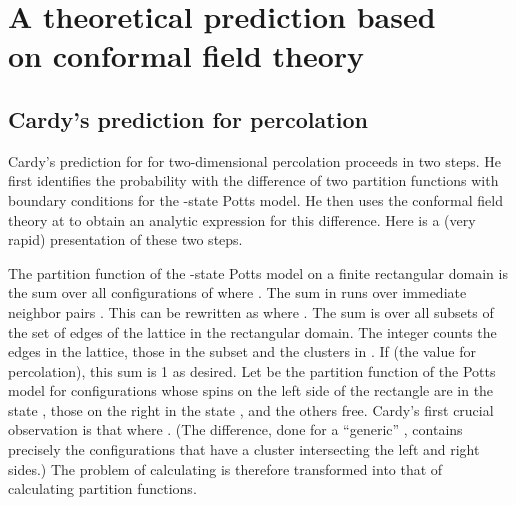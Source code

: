 \documentclass[a4paper,12pt]{article}
\begin{document}
 
\section{A theoretical prediction based\\ on conformal field theory}

\subsection{Cardy's prediction for percolation}

Cardy's prediction for \coordHE{} for two-dimensional percolation proceeds
in two steps. He first identifies the probability \coordHE{} with the
difference of two partition functions with boundary conditions for
the \coordHE{}-state Potts model. He then uses the 
conformal field theory at \coordHE{} to
obtain an analytic expression for this difference. Here is a (very
rapid) presentation of these two steps.

The partition function \coordHE{} of the \coordHE{}-state Potts model on a finite
rectangular domain is the sum over all configurations \myHighlight{$\sigma$}\coordHE{}
of \coordHE{} where \coordHE{}. The sum in \coordHE{} runs over
immediate neighbor pairs \coordHE{}. This can be rewritten as 
\coordHE{} where \coordHE{}.
The sum is over all subsets \coordHE{} of the set of edges of the lattice in
the rectangular domain. The integer \coordHE{} counts the edges in the lattice,
\coordHE{} those in the subset \coordHE{} and \coordHE{} the clusters
in \coordHE{}. If \coordHE{} (the value for percolation), this sum is 1 as desired.
Let \coordHE{} be the partition function of the Potts model for
configurations whose spins on the left side of the rectangle are in
the state \coordHE{}, those on the right in the
state \myHighlight{$\beta$}\coordHE{}, and the others free. Cardy's first crucial observation
is that \coordHE{}
where \myHighlight{$\alpha\neq\beta$}\coordHE{}. (The difference, done for a ``generic'' \coordHE{},
contains precisely the configurations that have a cluster intersecting the
left and right sides.) The problem of calculating \coordHE{} is therefore
transformed into that of calculating partition functions.
\end{document}
